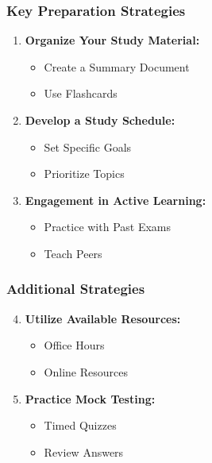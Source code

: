 \documentclass[aspectratio=169]{beamer}
\begin{document}
\begin{frame}[fragile]
    \frametitle{Key Preparation Strategies}
    \begin{enumerate}
        \item \textbf{Organize Your Study Material:}
        \begin{itemize}
            \item Create a Summary Document
            \item Use Flashcards
        \end{itemize}

        \item \textbf{Develop a Study Schedule:}
        \begin{itemize}
            \item Set Specific Goals
            \item Prioritize Topics
        \end{itemize}

        \item \textbf{Engagement in Active Learning:}
        \begin{itemize}
            \item Practice with Past Exams
            \item Teach Peers
        \end{itemize}
    \end{enumerate}
\end{frame}

\begin{frame}[fragile]
    \frametitle{Additional Strategies}
    \begin{enumerate}
        \setcounter{enumi}{3} %
        \item \textbf{Utilize Available Resources:}
        \begin{itemize}
            \item Office Hours
            \item Online Resources
        \end{itemize}

        \item \textbf{Practice Mock Testing:}
        \begin{itemize}
            \item Timed Quizzes
            \item Review Answers
        \end{itemize}
    \end{enumerate}
\end{frame}
\end{document}
